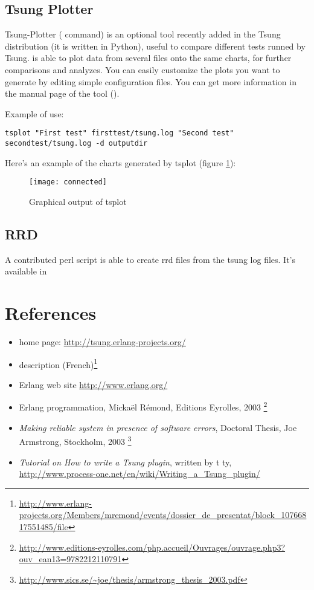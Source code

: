 \documentclass{TSUNG-en}
\begin{document}
\subsection{Tsung Plotter}
Tsung-Plotter ( command) is an optional tool recently
added in the Tsung distribution (it is written in Python), useful to
compare different tests runned by Tsung.  is able to
plot data from several  files onto the same charts,
for further comparisons and analyzes. You can easily customize the
plots you want to generate by editing simple configuration files. You
can get more information in the manual page of the tool ().

Example of use:
\begin{Verbatim}
tsplot "First test" firsttest/tsung.log "Second test" secondtest/tsung.log -d outputdir
\end{Verbatim}

Here's an example of the charts generated by tsplot (figure \ref{fig:graph:tsplot}):

\begin{figure}[htb]
  \begin{center}
    \texttt{[image: connected]}
    \end{center}
      \caption{Graphical output of tsplot}
    \label{fig:graph:tsplot}
\end{figure}

\subsection{RRD}
A contributed perl script  is able to create rrd
files from the tsung log files. It's available in 

\section{References}

\begin{itemize}
\item {} home page: \url{http://tsung.erlang-projects.org/}
\item {} description (French)\footnote{\url{http://www.erlang-projects.org/Members/mremond/events/dossier_de_presentat/block_10766817551485/file}}
\item Erlang web site \url{http://www.erlang.org/}
\item Erlang programmation, Mickaël Rémond, Editions Eyrolles, 2003
  \footnote{\url{http://www.editions-eyrolles.com/php.accueil/Ouvrages/ouvrage.php3?ouv_ean13=9782212110791}}
\item \emph{Making reliable system in presence of software errors}, Doctoral Thesis,
Joe Armstrong, Stockholm, 2003 \footnote{\url{http://www.sics.se/~joe/thesis/armstrong_thesis_2003.pdf}}
\item \emph{Tutorial on How to write a Tsung plugin}, written by t ty, \url{http://www.process-one.net/en/wiki/Writing_a_Tsung_plugin/}
\end{itemize}
\end{document}
